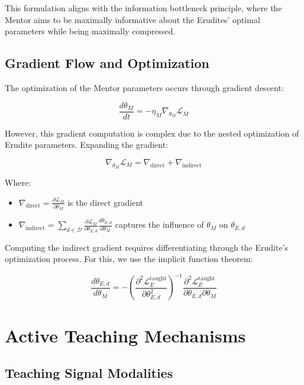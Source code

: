 This formulation aligns with the information bottleneck principle, where the Mentor aims to be maximally informative about the Erudites' optimal parameters while being maximally compressed.

\subsection{Gradient Flow and Optimization}

The optimization of the Mentor parameters occurs through gradient descent:

\begin{equation}
\frac{d\theta_M}{dt} = -\eta_M \nabla_{\theta_M} \mathcal{L}_M
\end{equation}

However, this gradient computation is complex due to the nested optimization of Erudite parameters. Expanding the gradient:

\begin{equation}
\nabla_{\theta_M} \mathcal{L}_M = \nabla_{\text{direct}} + \nabla_{\text{indirect}}
\end{equation}

Where:
\begin{itemize}
\item $\nabla_{\text{direct}} = \frac{\partial \mathcal{L}_M}{\partial \theta_M}$ is the direct gradient
\item $\nabla_{\text{indirect}} = \sum_{d \in \mathcal{D}} \frac{\partial \mathcal{L}_M}{\partial \theta_{E,d}} \frac{d\theta_{E,d}}{d\theta_M}$ captures the influence of $\theta_M$ on $\theta_{E,d}$
\end{itemize}

Computing the indirect gradient requires differentiating through the Erudite's optimization process. For this, we use the implicit function theorem:

\begin{equation}
\frac{d\theta_{E,d}}{d\theta_M} = -\left(\frac{\partial^2 \mathcal{L}_{E}^{\text{taught}}}{\partial \theta_{E,d}^2}\right)^{-1} \frac{\partial^2 \mathcal{L}_{E}^{\text{taught}}}{\partial \theta_{E,d} \partial \theta_M}
\end{equation}

\section{Active Teaching Mechanisms}

\subsection{Teaching Signal Modalities}

